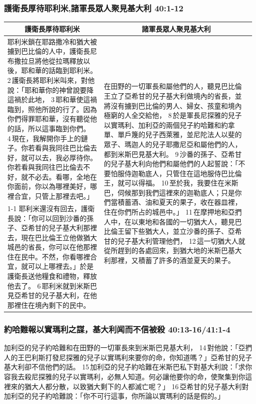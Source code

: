 \subsubsection{護衛長厚待耶利米,諸軍長眾人聚見基大利 40:1-12}
\begin{table}[H]
\centering
\begin{tabular}{p{8.5cm}|p{8.8cm}}\hline\hline
\multicolumn{1}{c|}{護衛長厚待耶利米}&\multicolumn{1}{c}{諸軍長眾人聚見基大利}\\\hline
耶利米鎖在耶路撒冷和猶大被擄到巴比倫的人中，護衛長尼布撒拉旦將他從拉瑪釋放以後，耶和華的話臨到耶利米。 2 護衛長將耶利米叫來，對他說：「耶和華你的神曾說要降這禍於此地， 3 耶和華使這禍臨到，照他所說的行了。因為你們得罪耶和華，沒有聽從他的話，所以這事臨到你們。 4 現在，我解開你手上的鏈子。你若看與我同往巴比倫去好，就可以去，我必厚待你。你若看與我同往巴比倫去不好，就不必去。看哪，全地在你面前，你以為哪裡美好，哪裡合宜，只管上那裡去吧。」
&\multirow{2}{9cm}{在田野的一切軍長和屬他們的人，聽見巴比倫王立了亞希甘的兒子基大利做境內的省長，並將沒有擄到巴比倫的男人、婦女、孩童和境內極窮的人全交給他， 8 於是軍長尼探雅的兒子以實瑪利、加利亞的兩個兒子約哈難和約拿單、單戶篾的兒子西萊雅，並尼陀法人以斐的眾子、瑪迦人的兒子耶撒尼亞和屬他們的人，都到米斯巴見基大利。 9 沙番的孫子、亞希甘的兒子基大利向他們和屬他們的人起誓說：「不要怕服侍迦勒底人，只管住在這地服侍巴比倫王，就可以得福。 10 至於我，我要住在米斯巴，伺候那到我們這裡來的迦勒底人；只是你們當積蓄酒、油和夏天的果子，收在器皿裡，住在你們所占的城邑中。」 11 在摩押地和亞捫人中，在以東地和各國的一切猶大人，聽見巴比倫王留下些猶大人，並立沙番的孫子、亞希甘的兒子基大利管理他們， 12 這一切猶大人就從所趕到的各處回來，到猶大地的米斯巴基大利那裡，又積蓄了許多的酒並夏天的果子。}\\\cline{1-1}
耶利米還沒有回去，護衛長說：「你可以回到沙番的孫子、亞希甘的兒子基大利那裡去，現在巴比倫王立他做猶大城邑的省長，你可以在他那裡住在民中。不然，你看哪裡合宜，就可以上哪裡去。」於是護衛長送他糧食和禮物，釋放他去了。 6 耶利米就到米斯巴見亞希甘的兒子基大利，在他那裡住在境內剩下的民中。&\\\hline
\end{tabular}
\end{table}
 
\subsubsection{約哈難報以實瑪利之謀，基大利闻而不信被殺 40:13-16/41:1-4}
加利亞的兒子約哈難和在田野的一切軍長來到米斯巴見基大利， 14 對他說：「亞捫人的王巴利斯打發尼探雅的兒子以實瑪利來要你的命，你知道嗎？」亞希甘的兒子基大利卻不信他們的話。 15 加利亞的兒子約哈難在米斯巴私下對基大利說：「求你容我去殺尼探雅的兒子以實瑪利，必無人知道。何必讓他要你的命，使聚集到你這裡來的猶大人都分散，以致猶大剩下的人都滅亡呢？」 16 亞希甘的兒子基大利對加利亞的兒子約哈難說：「你不可行這事，你所論以實瑪利的話是假的。」

